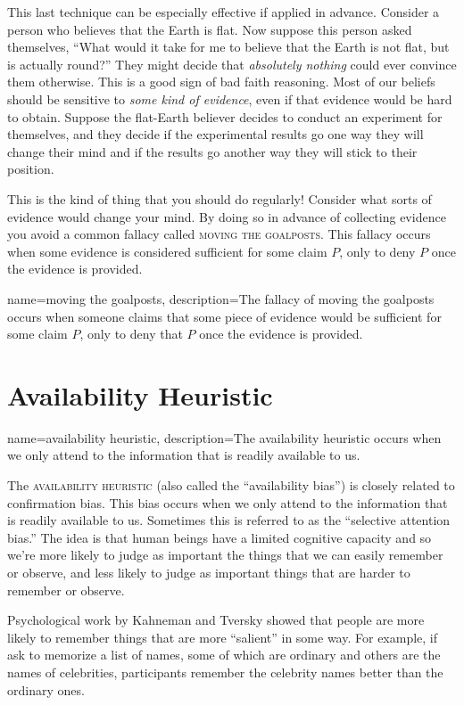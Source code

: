 This last technique can be especially effective if applied in advance. Consider a person who believes that the Earth is flat. Now suppose this person asked themselves, ``What would it take for me to believe that the Earth is not flat, but is actually round?'' They might decide that \emph{absolutely nothing} could ever convince them otherwise. This is a good sign of bad faith reasoning. Most of our beliefs should be sensitive to \emph{some kind of evidence}, even if that evidence would be hard to obtain. Suppose the flat-Earth believer decides to conduct an experiment for themselves, and they decide if the experimental results go one way they will change their mind and if the results go another way they will stick to their position.

This is the kind of thing that you should do regularly! Consider what sorts of evidence would change your mind. By doing so in advance of collecting evidence you avoid a common fallacy called \textsc{\gls{moving the goalposts}}. This fallacy occurs when some evidence is considered sufficient for some claim $P$, only to deny $P$ once the evidence is provided.

{
name=moving the goalposts,
description={The fallacy of moving the goalposts occurs when someone claims that some piece of evidence would be sufficient for some claim $P$, only to deny that $P$ once the evidence is provided.}
}

\section{Availability Heuristic}

{
name=availability heuristic,
description={The availability heuristic occurs when we only attend to the information that is readily available to us.}
}

The \textsc{\gls{availability heuristic}} (also called the ``availability bias'') is closely related to confirmation bias. This bias occurs when we only attend to the information that is readily available to us. Sometimes this is referred to as the ``selective attention bias.'' The idea is that human beings have a limited cognitive capacity and so we're more likely to judge as important the things that we can easily remember or observe, and less likely to judge as important things that are harder to remember or observe.

Psychological work by Kahneman and Tversky showed that people are more likely to remember things that are more ``salient'' in some way.\cite{tversky1973} For example, if ask to memorize a list of names, some of which are ordinary and others are the names of celebrities, participants remember the celebrity names better than the ordinary ones.

